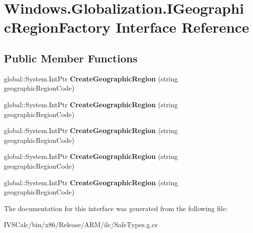 \hypertarget{interface_windows_1_1_globalization_1_1_i_geographic_region_factory}{}\section{Windows.\+Globalization.\+I\+Geographic\+Region\+Factory Interface Reference}
\label{interface_windows_1_1_globalization_1_1_i_geographic_region_factory}
\subsection*{Public Member Functions}
\begin{DoxyCompactItemize}
\item 
\mbox{\label{interface_windows_1_1_globalization_1_1_i_geographic_region_factory_ad47a4358ba3e4989ee2439752f68fc15}} 
global\+::\+System.\+Int\+Ptr {\bfseries Create\+Geographic\+Region} (string geographic\+Region\+Code)
\item 
\mbox{\label{interface_windows_1_1_globalization_1_1_i_geographic_region_factory_ad47a4358ba3e4989ee2439752f68fc15}} 
global\+::\+System.\+Int\+Ptr {\bfseries Create\+Geographic\+Region} (string geographic\+Region\+Code)
\item 
\mbox{\label{interface_windows_1_1_globalization_1_1_i_geographic_region_factory_ad47a4358ba3e4989ee2439752f68fc15}} 
global\+::\+System.\+Int\+Ptr {\bfseries Create\+Geographic\+Region} (string geographic\+Region\+Code)
\item 
\mbox{\label{interface_windows_1_1_globalization_1_1_i_geographic_region_factory_ad47a4358ba3e4989ee2439752f68fc15}} 
global\+::\+System.\+Int\+Ptr {\bfseries Create\+Geographic\+Region} (string geographic\+Region\+Code)
\item 
\mbox{\label{interface_windows_1_1_globalization_1_1_i_geographic_region_factory_ad47a4358ba3e4989ee2439752f68fc15}} 
global\+::\+System.\+Int\+Ptr {\bfseries Create\+Geographic\+Region} (string geographic\+Region\+Code)
\end{DoxyCompactItemize}


The documentation for this interface was generated from the following file\+:\begin{DoxyCompactItemize}
\item 
I\+V\+S\+Calc/bin/x86/\+Release/\+A\+R\+M/ilc/Safe\+Types.\+g.\+cs\end{DoxyCompactItemize}
